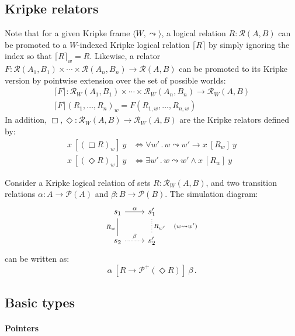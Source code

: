 \documentclass[acmsmall,anonymous]{acmart}
\newcommand{\ifr}[1]{\ [{#1}]\ }
\begin{document}
\subsection{Kripke relators}

Note that for a given Kripke frame $\langle W, \leadsto \rangle$,
a logical relation $R : \mathcal{R}(A, B)$
can be promoted to a $W$-indexed Kripke logical relation $\lceil R \rceil$
by simply ignoring the index so that $\lceil R \rceil_w = R$.
Likewise,
a relator
  $F : \mathcal{R}(A_1, B_1) \times \cdots \times \mathcal{R}(A_n, B_n) \rightarrow \mathcal{R}(A, B)$
can be promoted to its Kripke version
by pointwise extension over the set of possible worlds:
\begin{gather*}
  \lceil F \rceil : \mathcal{R}_W(A_1, B_1) \times \cdots \times \mathcal{R}_W(A_n, B_n) \rightarrow \mathcal{R}_W(A, B) \\
  \lceil F \rceil (R_1, \ldots, R_n)_w = F(R_{1,w}, \ldots, R_{n,w})
\end{gather*}
In addition,
$\Box, \Diamond : \mathcal{R}_W(A,B) \rightarrow \mathcal{R}_W(A,B)$
are the Kripke relators defined by:
\begin{align*}
  x \ifr{(\Box R)_w} y &\Leftrightarrow
    \forall w' \,.\, w \leadsto w' \rightarrow x \ifr{R_w} y \\
  x \ifr{(\Diamond R)_w} y &\Leftrightarrow
    \exists w' \,.\, w \leadsto w' \wedge x \ifr{R_w} y
\end{align*}

\begin{example}
Consider a Kripke logical relation of sets $R : \mathcal{R}_W(A, B)$,
and two transition relations $\alpha : A \rightarrow \mathcal{P}(A)$
and $\beta : B \rightarrow \mathcal{P}(B)$.
The simulation diagram:
\[
  \begin{tikzcd}
    s_1 \arrow[r, "\alpha"]
        \arrow[d, dash, "R_w"'] &
    s_1' \arrow[d, dotted, dash, "R_{w'} \quad (w \leadsto w')"] \\
    s_2 \arrow[r, dotted, "\beta"] &
    s_2'
  \end{tikzcd}
\]
can be written as:
\[
  \alpha \ifr{R \rightarrow \mathcal{P}^+(\Diamond R)} \beta \,.
\]
\end{example}

\subsection{Basic types}

\paragraph{Pointers}
\end{document}
